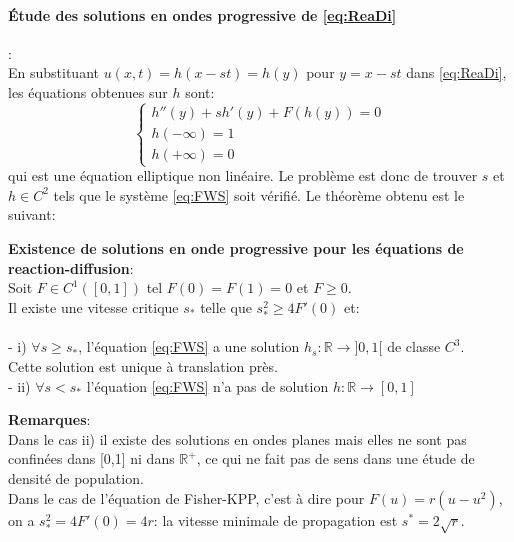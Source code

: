 \documentclass[11pt]{article}
\begin{document}
\paragraph{Étude des solutions en ondes progressive de \eqref{eq:ReaDi}}:\\
En substituant $u(x,t) = h(x-st) = h(y)$ pour $y=x-st$ dans \eqref{eq:ReaDi}, les équations obtenues sur $h$ sont: \begin{equation} \label{eq:FWS} \left\{
                \begin{array}{ll}
                h''(y)+ sh'(y)+F(h(y))=0 \\
                h(-\infty)= 1 \\  h(+\infty) =0 
                   \end{array}
              \right.
\end{equation} 
qui est une équation elliptique non linéaire. Le problème est donc de trouver $s$ et $h \in C^2$ tels que le système \eqref{eq:FWS} soit vérifié. Le théorème obtenu est le suivant:



\begin{theorem}{\textbf{Existence de solutions en onde progressive pour les équations de reaction-diffusion}}:\\
Soit $F \in C^1([0,1])$ tel $F(0)=F(1)=0$ et $F\geq 0$. \\
Il existe une vitesse critique $s_*$ telle que $s_*^2 \geq 4F'(0)$ et: \\ \\
- i) $\forall s \geq s_*$, l'équation \eqref{eq:FWS} a une solution $h_s:\mathbb{R} \rightarrow ]0,1[$ de classe $C^3$.\\ Cette solution est unique à translation près. \\
- ii)  $\forall s<s_*$ l'équation \eqref{eq:FWS} n'a pas de solution $h:\mathbb{R} \rightarrow [0,1]$
\end{theorem}
\textbf{Remarques}:\\
 Dans le cas ii) il existe des solutions en ondes planes mais elles ne sont pas confinées dans [0,1] ni dans $\mathbb{R}^+$, ce qui ne fait pas de sens dans une étude de densité de population.\\
 Dans le cas de l'équation de Fisher-KPP, c'est à dire pour $F(u)=r(u - u^2)$, on a $s_*^2 = 4F'(0) = 4r $: la vitesse minimale de propagation est $s^* =2\sqrt r $.

\newpage
\end{document}
